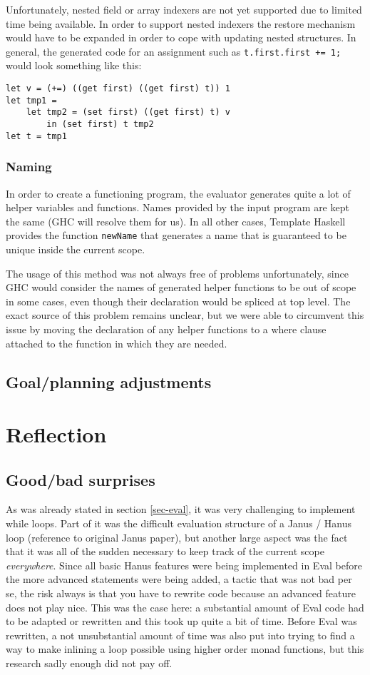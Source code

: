 \documentclass[12pt,a4paper]{article}
\begin{document}
Unfortunately, nested field or array indexers are not yet supported due to limited time being available. In order to support nested indexers the restore mechanism would have to be expanded in order to cope with updating nested structures. In general, the generated code for an assignment such as \texttt{t.first.first += 1;} would look something like this: 

\begin{verbatim}
let v = (+=) ((get first) ((get first) t)) 1
let tmp1 = 
    let tmp2 = (set first) ((get first) t) v 
        in (set first) t tmp2
let t = tmp1
\end{verbatim}

\subsubsection{Naming}
In order to create a functioning program, the evaluator generates quite a lot of helper variables and functions. Names provided by the input program are kept the same (GHC will resolve them for us). In all other cases, Template Haskell provides the function \texttt{newName} that generates a name that is guaranteed to be unique inside the current scope. 

The usage of this method was not always free of problems unfortunately, since GHC would consider the names of generated helper functions to be out of scope in some cases, even though their declaration would be spliced at top level. The exact source of this problem remains unclear, but we were able to circumvent this issue by moving the declaration of any helper functions to a where clause attached to the function in which they are needed. 
    
    \subsection{Goal/planning adjustments}
\section{Reflection}
    \subsection{Good/bad surprises}
        As was already stated in section \ref{sec-eval}, it was very challenging to implement while loops. Part of it was the difficult evaluation structure of a Janus / Hanus loop (reference to original Janus paper), but another large aspect was the fact that it was all of the sudden necessary to keep track of the current scope \emph{everywhere}. Since all basic Hanus features were being implemented in Eval before the more advanced statements were being added, a tactic that was not bad per se, the risk always is that you have to rewrite code because an advanced feature does not play nice. This was the case here: a substantial amount of Eval code had to be adapted or rewritten and this took up quite a bit of time. Before Eval was rewritten, a not unsubstantial amount of time was also put into trying to find a way to make inlining a loop possible using higher order monad functions, but this research sadly enough did not pay off.
\end{document}
